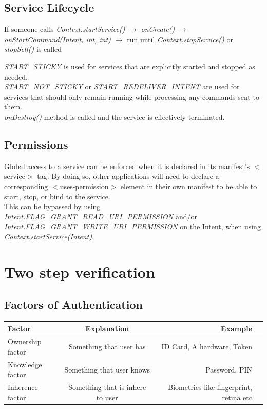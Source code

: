 \documentclass[12pt]{article}
\begin{document}
\subsection{Service Lifecycle}
 If someone calls \textit{Context.startService()} $\longrightarrow$ \textit{onCreate()} $\longrightarrow$ \\ \textit{onStartCommand(Intent, int, int) } $\longrightarrow$  run until \textit{Context.stopService()} or \textit{stopSelf()} is called

\textit{START\_STICKY} is used for services that are explicitly started and stopped as needed. \\
\textit{START\_NOT\_STICKY} or \textit{START\_REDELIVER\_INTENT} are used for services that should only remain running while processing any commands sent to them.\\
\textit{onDestroy()} method is called and the service is effectively terminated.

\subsection{Permissions}
Global access to a service can be enforced when it is declared in its manifest's $<$service$>$ tag. 
By doing so, other applications will need to declare a corresponding $<$uses-permission$>$ element in their own manifest to be able to start, stop, or bind to the service.\\
This can be bypassed by using \textit{Intent.FLAG\_GRANT\_READ\_URI\_PERMISSION} and/or \textit{Intent.FLAG\_GRANT\_WRITE\_URI\_PERMISSION }on the Intent, when using \textit{Context.startService(Intent)}.
\pagebreak


%
%
\section{Two step verification}
\subsection{Factors of Authentication}
\begin{tabular}{| l | c | r | p{}}
	\hline	
		Factor & Explanation & Example\\
		\hline
		\hline
		Ownership factor & Something that user has & ID Card, A hardware, Token \\ \hline
		Knowledge factor & Something that user knows & Password, PIN \\	\hline
		Inherence factor & Something that is inhere to user & Biometrics like fingerprint, retina etc\\
	\hline
\end{tabular}
\end{document}
